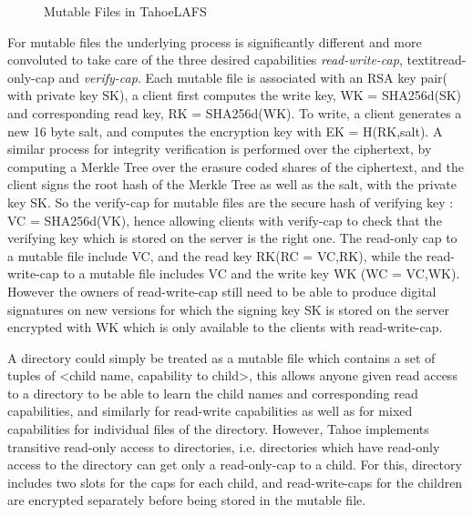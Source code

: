 \begin{figure}[h]
\centering
\caption{Mutable Files in TahoeLAFS}
\label{fig:mutable}
\end{figure}

For mutable files the underlying process is significantly different and more convoluted to take care of the three desired capabilities \textit{read-write-cap}, textit{read-only-cap} and \textit{verify-cap}. Each mutable file is associated with an RSA key pair( with private key SK), a client first computes the write key, WK = SHA256d(SK) and corresponding read key, RK = SHA256d(WK). To write, a client generates a new 16 byte salt, and computes the encryption key with EK = H(RK,salt). A similar process for integrity verification is performed over the ciphertext, by computing a Merkle Tree over the erasure coded shares of the ciphertext, and the client signs the root hash of the Merkle Tree as well as the salt, with the private key SK. So the verify-cap for mutable files are the secure hash of verifying key : VC = SHA256d(VK), hence allowing clients with verify-cap to check that the verifying key which is stored on the server is the right one. The read-only cap to a mutable file include VC, and the read key RK(RC = VC,RK), while the read-write-cap to a mutable file includes VC and the write key WK (WC = VC,WK). However the owners of read-write-cap still need to be able to produce digital signatures on new versions for which the signing key SK is stored on the server encrypted with WK which is only available to the clients with read-write-cap. 

A directory could simply be treated as a mutable file which contains a set of tuples of <child name, capability to child>, this allows anyone given read access to a directory to be able to learn the child names and corresponding read capabilities, and similarly for read-write capabilities as well as for mixed capabilities for individual files of the directory. However, Tahoe implements transitive read-only access to directories, i.e. directories which have read-only access to the directory can get only a read-only-cap to a child. For this, directory includes two slots for the caps for each child, and read-write-caps for the children are encrypted separately before being stored in the mutable file.

